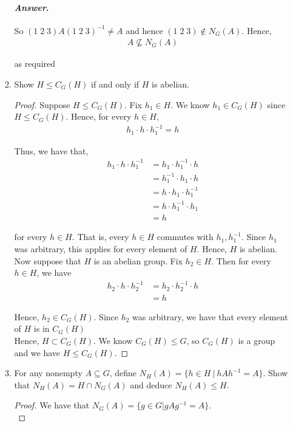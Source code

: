 \documentclass[11pt, reqno]{amsart}
\theoremstyle{plain}
\theoremstyle{definition}
\theoremstyle{example}
\newenvironment{ans}{\color{black}\medskip \paragraph*{\emph{Answer}.}}{\hfill \break  $~\!\!$ \dotfill \medskip }
\begin{document}
\begin{enumerate}[1.]
\begin{enumerate}
\begin{ans}
So $(1 \; 2 \; 3)A(1 \; 2 \; 3)^{-1} \neq A$ and hence $(1 \; 2 \; 3) \not\in N_G(A)$. Hence,
\begin{align*}
A \not\subseteq N_G(A)
\end{align*}

as required
\end{ans}

\item Show $H \leq C_G(H)$ if and only if $H$ is abelian.
\begin{proof}
Suppose $H \leq C_G(H)$. Fix $h_1 \in H$. We know $h_1 \in C_G(H)$ since $H \leq C_G(H)$. Hence, for every $h \in H$,
\begin{align*}
h_1 \cdot h \cdot h_1^{-1} = h
\end{align*}

Thus, we have that,
\begin{align*}
h_1 \cdot h \cdot h_1^{-1} &= h_1 \cdot h_1^{-1} \cdot h\\
&= h_1^{-1} \cdot h_1 \cdot h\\
&= h \cdot h_1 \cdot h_1^{-1}\\
&= h \cdot h_1^{-1} \cdot h_1\\
&= h
\end{align*}

for every $h \in H$. That is, every $h \in H$ commutes with $h_1, h_1^{-1}$. Since $h_1$ was arbitrary, this applies for every element of $H$. Hence, $H$ is abelian.\\

Now suppose that $H$ is an abelian group. Fix $h_2 \in H$. Then for every $h \in H$, we have
\begin{align*}
h_2 \cdot h \cdot h_2^{-1} &= h_2 \cdot h_2^{-1} \cdot h\\
&= h
\end{align*}

Hence, $h_2 \in C_G(H)$. Since $h_2$ was arbitrary, we have that every element of $H$ is in $C_G(H)$\\

Hence, $H \subset C_G(H)$. We know $C_G(H) \leqslant G$, so $C_G(H)$ is a group and we have $H \leqslant C_G(H)$.
\end{proof}

\item For any nonempty $A \subseteq G$, define $N_H(A) = \{ h \in H ~|~ hAh^{-1} = A \}$. Show that $N_H(A) = H \cap N_G(A)$ and deduce $N_H(A) \leq H$. 
\begin{proof}
We have that $N_G(A) = \{g \in G | gAg^{-1} = A\}$.\\


\end{proof}
\end{enumerate}
\end{enumerate}
\end{document}
